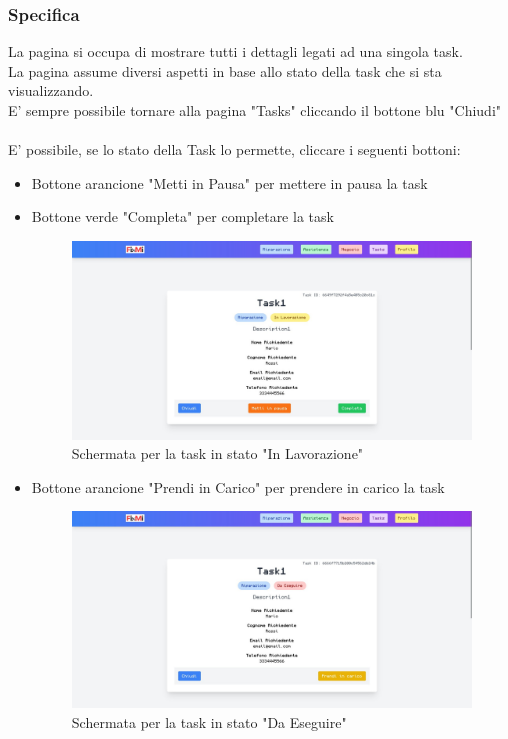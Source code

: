 \documentclass{report}
\begin{document}
\subsubsection*{Specifica}
La pagina si occupa di mostrare tutti i dettagli legati ad una singola task.\\ La pagina assume diversi aspetti in base allo stato della task che si sta visualizzando.\\E' sempre possibile tornare alla pagina "Tasks" cliccando il bottone blu "Chiudi"\\\\
E' possibile, se lo stato della Task lo permette, cliccare i seguenti bottoni:

\begin{itemize}
	\item Bottone arancione "Metti in Pausa" per mettere in pausa la task 
	\item Bottone verde "Completa" per completare la task 
	\begin{figure}[H]
		\centering\includegraphics[width=1\textwidth]{images/microservizio-task/frontend/InLavorazione.jpg}
		\caption{Schermata per la task in stato "In Lavorazione"}
	\end{figure}
\end{itemize}

\begin{itemize}
	\item Bottone arancione "Prendi in Carico" per prendere in carico la task
	\begin{figure}[H]
		\centering\includegraphics[width=1\textwidth]{images/microservizio-task/frontend/DaEseguire.jpg}
		\caption{Schermata per la task in stato "Da Eseguire"}
	\end{figure}
\end{itemize}
\end{document}
